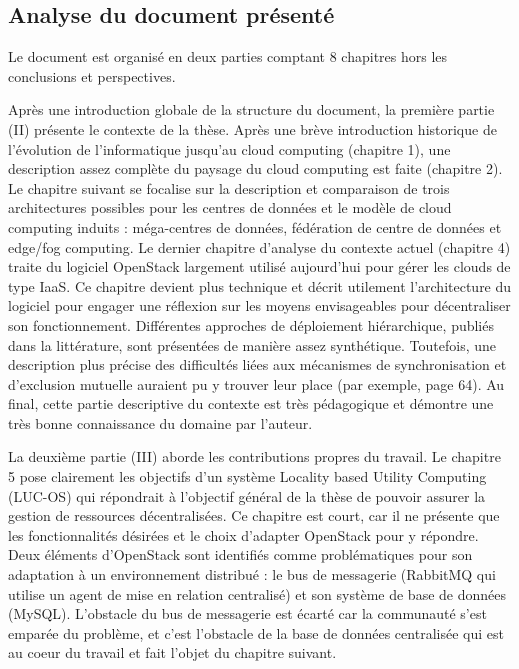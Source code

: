 \documentclass[a4paper,12pt]{article}
\begin{document}
\subsection*{Analyse du document présenté}

Le document est organisé en deux parties comptant 8 chapitres hors les
conclusions et perspectives.

Après une introduction  globale de la structure du document,  la première partie
(II) présente le  contexte de la thèse. Après une  brève introduction historique
de  l'évolution de  l'informatique jusqu'au  cloud computing  (chapitre 1),  une
description assez  complète du  paysage du cloud  computing est  faite (chapitre
2). Le chapitre  suivant se focalise sur la description  et comparaison de trois
architectures  possibles pour  les  centres de  données et  le  modèle de  cloud
computing induits : méga-centres de données,  fédération de centre de données et
edge/fog computing. Le  dernier chapitre d'analyse du  contexte actuel (chapitre
4) traite  du logiciel  OpenStack largement utilisé  aujourd'hui pour  gérer les
clouds de  type IaaS.  Ce  chapitre devient  plus technique et  décrit utilement
l'architecture  du   logiciel  pour  engager   une  réflexion  sur   les  moyens
envisageables pour  décentraliser son  fonctionnement. Différentes  approches de
déploiement  hiérarchique,  publiés  dans  la littérature,  sont  présentées  de
manière  assez  synthétique.   Toutefois,   une  description  plus  précise  des
difficultés  liées aux  mécanismes  de synchronisation  et d'exclusion  mutuelle
auraient pu y trouver leur place (par  exemple, page 64). Au final, cette partie
descriptive  du  contexte  est  très  pédagogique et  démontre  une  très  bonne
connaissance du domaine par l'auteur.

La  deuxième partie  (III)  aborde  les contributions  propres  du travail.   Le
chapitre 5  pose clairement  les objectifs d'un  système Locality  based Utility
Computing (LUC-OS)  qui répondrait à l'objectif  général de la thèse  de pouvoir
assurer la gestion  de ressources décentralisées. Ce chapitre est  court, car il
ne présente  que les  fonctionnalités désirées et  le choix  d'adapter OpenStack
pour y répondre. Deux éléments  d'OpenStack sont identifiés comme problématiques
pour  son  adaptation à  un  environnement  distribué  :  le bus  de  messagerie
(RabbitMQ qui utilise un agent de mise en relation centralisé) et son système de
base  de données  (MySQL). L'obstacle  du bus  de messagerie  est écarté  car la
communauté s'est emparée du problème, et  c'est l'obstacle de la base de données
centralisée qui est au coeur du travail  et fait l'objet du chapitre suivant. 
\end{document}
